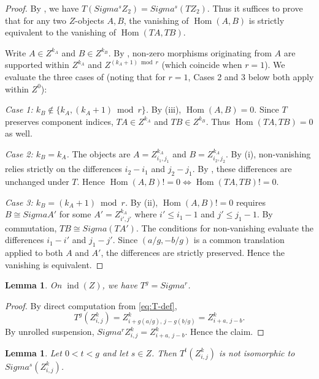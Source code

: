 \documentclass[11pt, a4paper]{article}
\newtheorem{lemma}[theorem]{Lemma}
\theoremstyle{definition}
\def\Sigma{Sigma}%
\def\neq{!=}%
\def\mathbb#1{#1}%
\def\mathcal#1{#1}%
\begin{document}
\begin{proof}
By , we have $T(\Sigma^s Z_2) = \Sigma^s(T Z_2)$. Thus it suffices to prove that for any two $\mathcal Z$-objects $A, B$, the vanishing of $\operatorname{Hom}(A,B)$ is strictly equivalent to the vanishing of $\operatorname{Hom}(TA, TB)$. 

Write $A \in \mathcal Z^{k_A}$ and $B \in \mathcal Z^{k_B}$. By , non-zero morphisms originating from $A$ are supported within $\mathcal Z^{k_A}$ and $\mathcal Z^{(k_A+1) \bmod r}$ (which coincide when $r=1$). We evaluate the three cases of  (noting that for $r=1$, Cases 2 and 3 below both apply within $\mathcal Z^0$):

\emph{Case 1: $k_B \notin \{k_A, (k_A+1)\bmod r\}$.} By (iii), $\operatorname{Hom}(A,B) = 0$. Since $T$ preserves component indices, $TA \in \mathcal Z^{k_A}$ and $TB \in \mathcal Z^{k_B}$. Thus $\operatorname{Hom}(TA, TB) = 0$ as well.

\emph{Case 2: $k_B = k_A$.} The objects are $A = Z_{i_1, j_1}^{k_A}$ and $B = Z_{i_2, j_2}^{k_A}$. By (i), non-vanishing relies strictly on the differences $i_2 - i_1$ and $j_2 - j_1$. By , these differences are unchanged under $T$. Hence $\operatorname{Hom}(A,B) \neq 0 \iff \operatorname{Hom}(TA, TB) \neq 0$.

\emph{Case 3: $k_B = (k_A + 1)\bmod r$.} By (ii), $\operatorname{Hom}(A,B) \neq 0$ requires $B \cong \Sigma A'$ for some $A' = Z_{i', j'}^{k_A}$ where $i' \le i_1-1$ and $j' \le j_1-1$. By commutation, $TB \cong \Sigma(T A')$. The conditions for non-vanishing evaluate the differences $i_1 - i'$ and $j_1 - j'$. Since $(a/g, -b/g)$ is a common translation applied to both $A$ and $A'$, the differences are strictly preserved. Hence the vanishing is equivalent.
\end{proof}

\begin{lemma}\label{lem:T-power}
On $\operatorname{ind}(\mathcal Z)$, we have $T^g = \Sigma^r$.
\end{lemma}

\begin{proof}
By direct computation from \eqref{eq:T-def},
\[
  T^g(Z_{i,j}^k) = Z_{i+g(a/g),\, j-g(b/g)}^k = Z_{i+a,\, j-b}^k.
\]
By unrolled suspension, $\Sigma^r Z_{i,j}^k = Z_{i+a,\, j-b}^k$. Hence the claim.
\end{proof}

\begin{lemma}\label{lem:faithful}
Let $0 < t < g$ and let $s \in \mathbb Z$. Then $T^t(Z_{i,j}^k)$ is not isomorphic to $\Sigma^s(Z_{i,j}^k)$.
\end{lemma}
\end{document}

